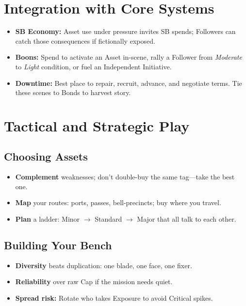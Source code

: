 \begin{multicols}{2}
\section{Integration with Core Systems}
\begin{itemize}
  \item \textbf{SB Economy:} Asset use under pressure invites SB spends; Followers can catch those consequences if fictionally exposed.
  \item \textbf{Boons:} Spend to activate an Asset in-scene, rally a Follower from \emph{Moderate} to \emph{Light} condition, or fuel an Independent Initiative.
  \item \textbf{Downtime:} Best place to repair, recruit, advance, and negotiate terms. Tie these scenes to Bonds to harvest story.
\end{itemize}

\section{Tactical and Strategic Play}
\subsection*{Choosing Assets}
\begin{itemize}
  \item \textbf{Complement} weaknesses; don’t double-buy the same tag—take the best one.
  \item \textbf{Map} your routes: ports, passes, bell-precincts; buy where you travel.
  \item \textbf{Plan} a ladder: Minor \(\rightarrow\) Standard \(\rightarrow\) Major that all talk to each other.
\end{itemize}

\subsection*{Building Your Bench}
\begin{itemize}
  \item \textbf{Diversity} beats duplication: one blade, one face, one fixer.
  \item \textbf{Reliability} over raw Cap if the mission needs quiet.
  \item \textbf{Spread risk:} Rotate who takes Exposure to avoid Critical spikes.
\end{itemize}


\end{multicols}
